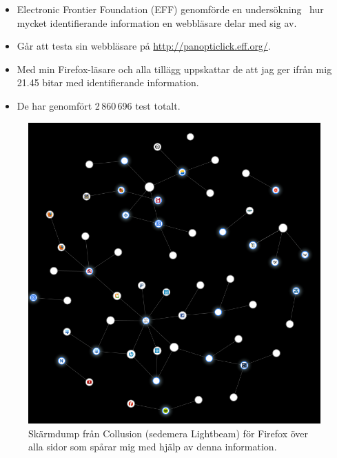 \documentclass{beamer}
\theoremstyle{definition}
\begin{document}
\begin{frame}{\insertsubsectionhead}
  \begin{itemize}
    \item Electronic Frontier Foundation (EFF) genomförde en 
      undersökning~\cite{Eckersley2010hui} hur mycket identifierande 
      information en webbläsare delar med sig av.

    \item Går att testa sin webbläsare på \url{http://panopticlick.eff.org/}.

    \item Med min Firefox-läsare och alla tillägg uppskattar de att jag ger 
      ifrån mig 21.45 bitar med identifierande information.

    \item De har genomfört 2\,860\,696 test totalt.

  \end{itemize}
\end{frame}

\begin{frame}{\insertsubsectionhead}
  \begin{figure}
    \includegraphics[height=0.7\textheight]{collusion.png}
    \caption{Skärmdump från Collusion (sedemera Lightbeam) för Firefox över 
    alla sidor som spårar mig med hjälp av denna information.}
  \end{figure}
\end{frame}
\end{document}
